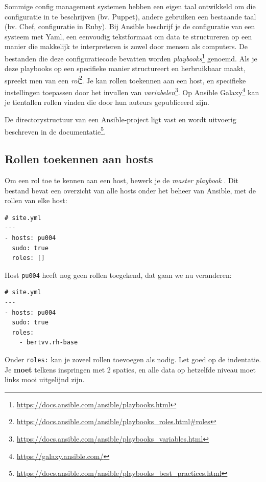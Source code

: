 Sommige config management systemen hebben een eigen taal ontwikkeld om die configuratie in te beschrijven (bv. Puppet), andere gebruiken een bestaande taal (bv. Chef, configuratie in Ruby). Bij Ansible beschrijf je de configuratie van een systeem met Yaml, een eenvoudig tekstformaat om data te structureren op een manier die makkelijk te interpreteren is zowel door mensen als computers. De bestanden die deze configuratiecode bevatten worden \emph{playbooks}\footnote{\url{https://docs.ansible.com/ansible/playbooks.html}} genoemd. Als je deze playbooks op een specifieke manier structureert en herbruikbaar maakt, spreekt men van een \emph{rol}\footnote{\url{https://docs.ansible.com/ansible/playbooks_roles.html\#roles}}. Je kan rollen toekennen aan een host, en specifieke instellingen toepassen door het invullen van \emph{variabelen}\footnote{\url{https://docs.ansible.com/ansible/playbooks_variables.html}}. Op Ansible Galaxy\footnote{\url{https://galaxy.ansible.com/}} kan je tientallen rollen vinden die door hun auteurs gepubliceerd zijn.

De directorystructuur van een Ansible-project ligt vast en wordt uitvoerig beschreven in de documentatie\footnote{\url{https://docs.ansible.com/ansible/playbooks_best_practices.html}}.

\subsection{Rollen toekennen aan hosts}
\label{sub:rollen-toekennen-aan-hosts}

Om een rol toe te kennen aan een host, bewerk je de \emph{master playbook} . Dit bestand bevat een overzicht van alle hosts onder het beheer van Ansible, met de rollen van elke host:

\begin{verbatim}
# site.yml
---
- hosts: pu004
  sudo: true
  roles: []
\end{verbatim}

Host \texttt{pu004} heeft nog geen rollen toegekend, dat gaan we nu veranderen:

\begin{verbatim}
# site.yml
---
- hosts: pu004
  sudo: true
  roles:
    - bertvv.rh-base
\end{verbatim}

Onder \texttt{roles:} kan je zoveel rollen toevoegen als nodig. Let goed op de indentatie. Je \textbf{moet} telkens inspringen met 2 spaties, en alle data op hetzelfde niveau moet links mooi uitgelijnd zijn.

